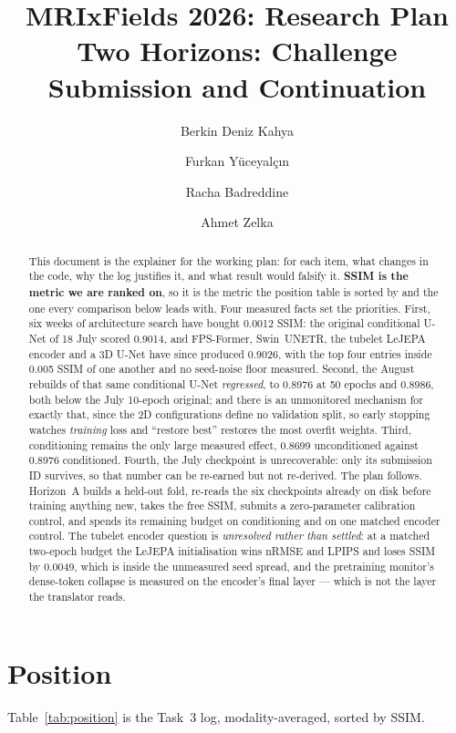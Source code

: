 \documentclass[11pt,a4paper]{article}
\title{\bfseries MRIxFields 2026: Research Plan\\[0.3em]
\large Two Horizons: Challenge Submission and Continuation}
\author{Berkin Deniz Kahya \and Furkan Yüceyalç\i{}n \and Racha Badreddine \and Ahmet Zelka}
\date{}
\newcommand{\rmse}{nRMSE}
\begin{document}
\maketitle

\begin{abstract}
\noindent
This document is the explainer for the working plan: for each item, what changes in the code, why the
log justifies it, and what result would falsify it. \textbf{SSIM is the metric we are ranked on}, so it
is the metric the position table is sorted by and the one every comparison below leads with. Four
measured facts set the priorities. First, six weeks of architecture search have bought
\num{+0.0012} SSIM: the original conditional U-Net of 18 July scored \num{0.9014}, and FPS-Former,
Swin~UNETR, the tubelet LeJEPA encoder and a 3D U-Net have since produced \num{0.9026}, with the top four
entries inside \num{0.005} SSIM of one another and no seed-noise floor measured. Second, the August
rebuilds of that same conditional U-Net \emph{regressed}, to \num{0.8976} at 50 epochs and \num{0.8986},
both below the July 10-epoch original; and there is an unmonitored mechanism for exactly that, since the
2D configurations define no validation split, so early stopping watches \emph{training} loss and
``restore best'' restores the most overfit weights. Third, conditioning remains the only large measured
effect, \num{0.8699} unconditioned against \num{0.8976} conditioned. Fourth, the July checkpoint is
unrecoverable: only its submission ID survives, so that number can be re-earned but not re-derived. The
plan follows. Horizon~A builds a held-out fold, re-reads the six checkpoints already on disk before
training anything new, takes the free SSIM, submits a zero-parameter calibration control, and spends its
remaining budget on conditioning and on one matched encoder control. The tubelet encoder question is
\emph{unresolved rather than settled}: at a matched two-epoch budget the LeJEPA initialisation wins
\rmse{} and LPIPS and loses SSIM by \num{0.0049}, which is inside the unmeasured seed spread, and the
pretraining monitor's dense-token collapse is measured on the encoder's final layer --- which is not the
layer the translator reads.
\end{abstract}

\section{Position}
\label{sec:position}

Table~\ref{tab:position} is the Task~3 log, modality-averaged, sorted by SSIM.
\end{document}
